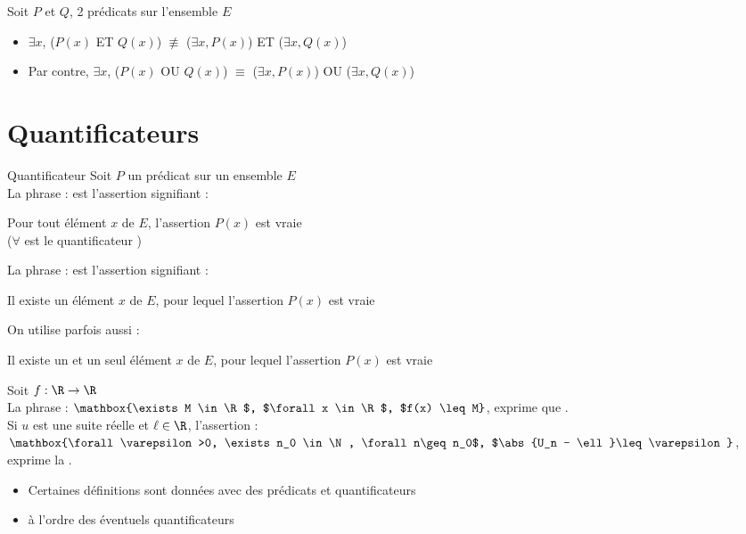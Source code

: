 \documentclass[12pt, a4paper]{report}
\begin{document}
\begin{remarque}
Soit $P$ et $Q$, 2 prédicats sur l'ensemble $E$
\begin{itemize}
    \item $\exists x$, ($P(x)$ ET $Q(x)$) $\nequiv$ ($\exists x, P(x)$) ET ($\exists x, Q(x)$)
    \item Par contre, $\exists x$, ($P(x)$ OU $Q(x)$) $\equiv$ ($\exists x, P(x)$) OU ($\exists x, Q(x)$)
\end{itemize}
\end{remarque}

\section{Quantificateurs}
\begin{definition}{Quantificateur}{}
Soit $P$ un prédicat sur un ensemble $E$\\
La phrase :  est l'assertion signifiant :
\begin{center}
    Pour tout élément $x$ de $E$, l'assertion $P(x)$ est vraie\\
    ($\forall$ est le quantificateur )
\end{center}
La phrase :  est l'assertion signifiant :
\begin{center}
    Il existe un élément $x$ de $E$, pour lequel l'assertion $P(x)$ est vraie
\end{center}
On utilise parfois aussi : 
\begin{center}
    Il existe un et un seul élément $x$ de $E$, pour lequel l'assertion $P(x)$ est vraie
\end{center}
\end{definition}

\begin{exemple}
Soit $f:\R \to \R$\\
La phrase : $\mathbox{\exists M \in \R$, $\forall x \in \R$, $f(x) \leq M}$, exprime que . \\
Si $u$ est une suite réelle et $\ell \in \R$, l'assertion : $\mathbox{\forall \varepsilon >0, \exists n_0 \in \N, \forall n\geq n_0$, $\abs{U_n - \ell}\leq \varepsilon}$, exprime la .

\end{exemple}

\begin{remarque}[Remarques]
\begin{itemize}
    \item Certaines définitions sont données avec des prédicats et quantificateurs
    \item {} à l'ordre des éventuels quantificateurs 
\end{itemize}
\end{remarque}
\end{document}
